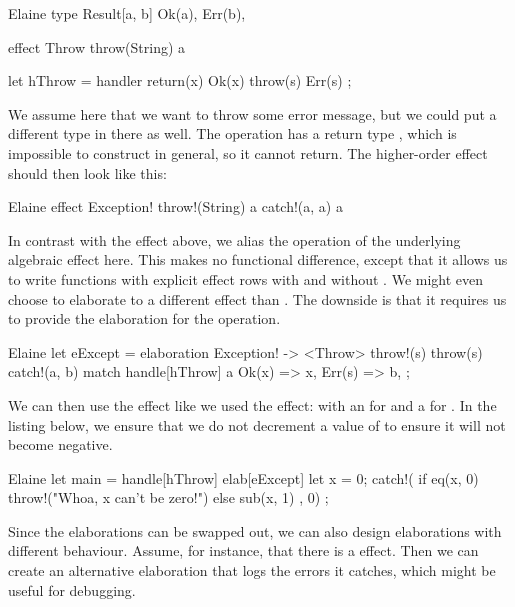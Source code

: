 \begin{lst}{Elaine}
type Result[a, b] {
    Ok(a),
    Err(b),
}

effect Throw {
    throw(String) a
}

let hThrow = handler {
    return(x) { Ok(x) }
    throw(s) { Err(s) }
};
\end{lst}

We assume here that we want to throw some error message, but we could put a different type in there as well. The  operation has a return type , which is impossible to construct in general, so it cannot return. The higher-order  effect should then look like this:

\begin{lst}{Elaine}
effect Exception! {
    throw!(String) a
    catch!(a, a) a
}
\end{lst}

In contrast with the  effect above, we alias the operation of the underlying algebraic effect here. This makes no functional difference, except that it allows us to write functions with explicit effect rows with  and without . We might even choose to elaborate to a different effect than . The downside is that it requires us to provide the elaboration for the  operation.

\begin{lst}{Elaine}
let eExcept = elaboration Exception! -> <Throw> {
    throw!(s) { throw(s) }
    catch!(a, b) {
        match handle[hThrow] a {
            Ok(x) => x,
            Err(s) => b,
        }
    }
};
\end{lst}

We can then use the effect like we used the  effect: with an  for  and a  for . In the listing below, we ensure that we do not decrement a value of  to ensure it will not become negative.

\begin{lst}{Elaine}
let main = handle[hThrow] elab[eExcept] {
    let x = 0;
    catch!({
        if eq(x, 0) {
            throw!("Whoa, x can't be zero!")
        } else {
            sub(x, 1) 
        }
    }, 0)
};
\end{lst}

Since the elaborations can be swapped out, we can also design elaborations with different behaviour. Assume, for instance, that there is a  effect. Then we can create an alternative elaboration that logs the errors it catches, which might be useful for debugging.

